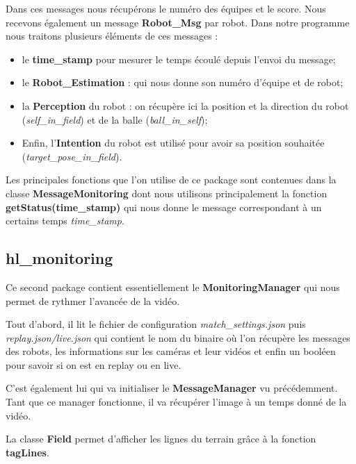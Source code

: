 Dans ces messages nous récupérons le numéro des équipes et le 
score.
Nous recevons également un message \textbf{Robot\_Msg} par
robot. Dans notre programme nous traitons plusieurs éléments
de ces messages :
\begin{itemize}
    \item le \textbf{time\_stamp} pour mesurer le temps écoulé
    depuis l'envoi du message;
    \item le \textbf{Robot\_Estimation} : qui nous donne son 
    numéro d'équipe et de robot;
    \item la \textbf{Perception} du robot : on récupère ici la
    position et la direction du robot
    (\textit{self\_in\_field}) et de la balle 
    (\textit{ball\_in\_self});
    \item Enfin, l'\textbf{Intention} du robot est utilisé 
    pour avoir sa position souhaitée 
    (\textit{target\_pose\_in\_field}).
    
\end{itemize}
\bigskip

Les principales fonctions que l'on utilise de ce package sont 
contenues dans la classe \textbf{MessageMonitoring} dont nous 
utilisons principalement la fonction 
\textbf{getStatus(time\_stamp)} qui nous donne le message 
correspondant à un certains temps \textit{time\_stamp}.
\bigskip

\subsection{hl\_monitoring}

Ce second package contient essentiellement le 
\textbf{MonitoringManager} qui nous permet de rythmer 
l'avancée de la vidéo. 
\bigskip

Tout d'abord, il lit le fichier de configuration 
\textit{match\_settings.json} puis 
\textit{replay.json/live.json} qui contient le nom du binaire 
où l'on récupère les messages des robots, les informations sur
les caméras et leur vidéos et enfin un booléen pour savoir si 
on est en replay ou en live.

C'est également lui qui va initialiser le 
\textbf{MessageManager} vu précédemment. Tant que ce manager 
fonctionne, il va récupérer l'image à un temps donné de la 
vidéo. 
\bigskip

La classe \textbf{Field} permet d'afficher les lignes du 
terrain grâce à la fonction \textbf{tagLines}.
\bigskip

